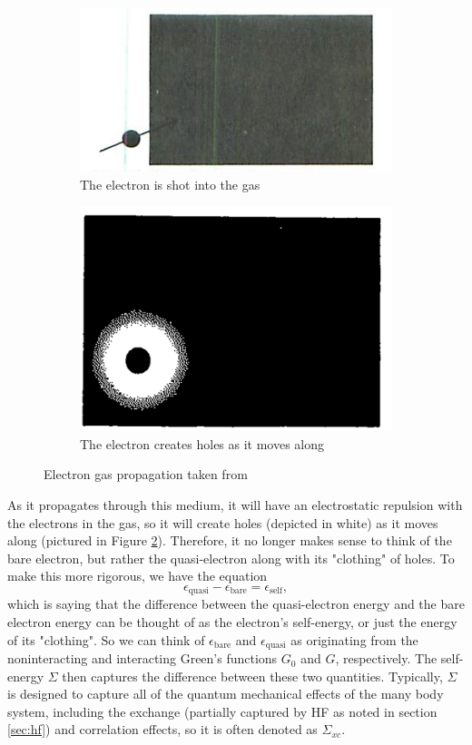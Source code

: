 \documentclass[12pt]{caltech_thesis}
\begin{document}
\begin{figure}
\begin{subfigure}{.5\textwidth}
  \centering
  \includegraphics[width=.8\linewidth]{shot.png}
  \caption{The electron is shot into the gas}
  \label{fig:shot}
\end{subfigure}
\begin{subfigure}{.5\textwidth}
  \centering
  \includegraphics[width=.8\linewidth]{clothing.png}
  \caption{The electron creates holes as it moves along}
  \label{fig:clothing}
\end{subfigure}
\caption{Electron gas propagation taken from \textcite{mattuck_guide_1992}}
\label{fig:propagates}
\end{figure}
As it propagates through this medium, it will have an electrostatic repulsion with the electrons in the gas, so it will create holes (depicted in white) as it moves along (pictured in Figure \ref{fig:clothing}). Therefore, it no longer makes sense to think of the bare electron, but rather the quasi-electron along with its "clothing" of holes. To make this more rigorous, we have the equation
\begin{equation}
    \epsilon_{\text{quasi}} - \epsilon_{\text{bare}} = \epsilon_{\text{self}},
\end{equation}
which is saying that the difference between the quasi-electron energy and the bare electron energy can be thought of as the electron's self-energy, or just the energy of its "clothing". So we can think of $\epsilon_{\text{bare}}$ and $\epsilon_{\text{quasi}}$ as originating from the noninteracting and interacting Green's functions $G_0$ and $G$, respectively. The self-energy $\Sigma$ then captures the difference between these two quantities. Typically, $\Sigma $ is designed to capture all of the quantum mechanical effects of the many body system, including the exchange (partially captured by HF as noted in section \ref{sec:hf}) and correlation effects, so it is often denoted as $\Sigma_{xc}$.
\end{document}
